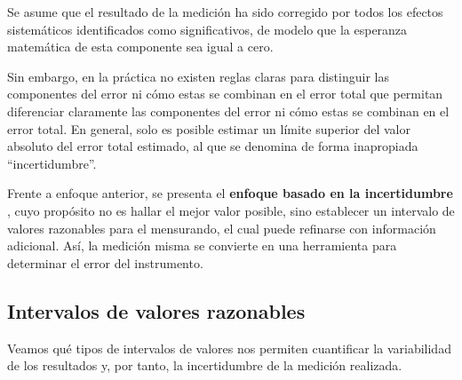 Se asume que el resultado de la medición ha sido corregido por todos los efectos sistemáticos identificados
como significativos, de modelo que la esperanza matemática de esta componente sea igual a cero.

Sin embargo, en la práctica no existen reglas claras para distinguir las componentes del error ni cómo estas 
se combinan en el error total
 que permitan diferenciar claramente las componentes del error ni
cómo estas se combinan en el error total. En general, solo es posible estimar un límite superior del valor 
absoluto del error total estimado, al que se denomina de forma inapropiada ``incertidumbre''. 

Frente a enfoque anterior, se presenta el \textbf{enfoque basado en la incertidumbre} \cite{jcgm100:2008}, 
cuyo propósito no es hallar el mejor valor posible, sino establecer un intervalo de valores razonables para el 
mensurando, el cual puede refinarse con información adicional. Así, la medición misma se convierte en una 
herramienta para determinar el error del instrumento. 


\subsection{Intervalos de valores razonables}

Veamos qué tipos de intervalos de valores nos permiten cuantificar la variabilidad de los resultados y, por 
tanto, la incertidumbre de la medición realizada. 


